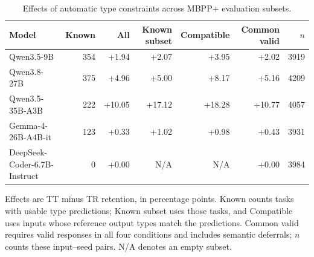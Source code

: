 \begin{table}[t]
\centering
\small
\caption{Effects of automatic type constraints across MBPP+ evaluation subsets.}
\label{tab:s_type_diagnostics}
\begin{tabular}{lrrrrrr}
\toprule
Model & Known & All & Known subset & Compatible & Common valid & $n$ \\
\midrule
Qwen3.5-9B & 354 & +1.94 & +2.07 & +3.95 & +2.02 & 3919 \\
Qwen3.8-27B & 375 & +4.96 & +5.00 & +8.17 & +5.16 & 4209 \\
Qwen3.5-35B-A3B & 222 & +10.05 & +17.12 & +18.28 & +10.77 & 4057 \\
Gemma-4-26B-A4B-it & 123 & +0.33 & +1.02 & +0.98 & +0.43 & 3931 \\
DeepSeek-Coder-6.7B-Instruct & 0 & +0.00 & N/A & N/A & +0.00 & 3984 \\
\bottomrule
\end{tabular}
\par\smallskip
\begin{minipage}{\linewidth}
\footnotesize
Effects are TT minus TR retention, in percentage points. Known counts tasks with usable type predictions; Known subset uses those tasks, and Compatible uses inputs whose reference output types match the predictions. Common valid requires valid responses in all four conditions and includes semantic deferrals; $n$ counts these input--seed pairs. N/A denotes an empty subset.
\end{minipage}
\end{table}
